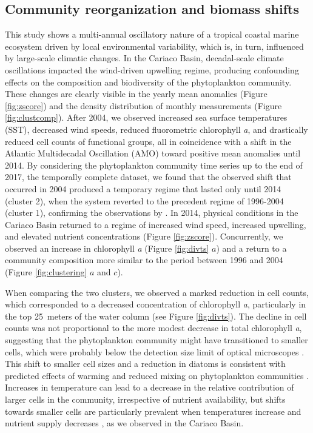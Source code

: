 \documentclass[draft]{agujournal2019}
\begin{document}
\subsection{Community reorganization and biomass shifts}
    This study shows  a multi-annual oscillatory nature of a tropical coastal marine ecosystem driven by local environmental variability, which is, in turn, influenced by large-scale climatic changes. In the Cariaco Basin, decadal-scale climate oscillations impacted the wind-driven upwelling regime, producing confounding effects on the composition and biodiversity of the phytoplankton community.
    These changes are clearly visible in the yearly mean anomalies (Figure \ref{fig:zscore}) and the density distribution of monthly measurements (Figure \ref{fig:clustcomp}). After 2004, we observed increased sea surface temperatures (SST), decreased wind speeds, reduced fluorometric chlorophyll \textit{a}, and drastically reduced cell counts of functional groups, all in coincidence with a shift in the Atlantic Multidecadal Oscillation (AMO) toward positive mean anomalies until 2014. 
    By considering the phytoplankton community time series up to the end of 2017, the temporally complete dataset, we found that the observed shift that occurred in 2004 produced a temporary regime that lasted only until 2014 (cluster 2), when the system reverted to the precedent regime of 1996-2004 (cluster 1), confirming the observations by . In 2014, physical conditions in the Cariaco Basin returned to a regime of increased wind speed, increased upwelling, and elevated nutrient concentrations (Figure \ref{fig:zscore}). Concurrently, we observed an increase in chlorophyll \textit{a} (Figure \ref{fig:divts} $a$) and a return to a community composition more similar to the period between 1996 and 2004 (Figure \ref{fig:clustering} $a$ and $c$).
    
    When comparing the two clusters, we observed a marked reduction in cell counts, which corresponded to a decreased concentration of chlorophyll \textit{a}, particularly in the top \qty{25}{meters} of the water column (see Figure \ref{fig:divts}). The decline in cell counts was not proportional to the more modest decrease in total chlorophyll \textit{a}, suggesting that the phytoplankton community might have transitioned to smaller cells, which were probably below the detection size limit of optical microscopes \cite{muller-karger_scientific_2019}. This shift to smaller cell sizes and a reduction in diatoms is consistent with predicted effects of warming and reduced mixing on phytoplankton communities \cite{bopp_response_2005}. Increases in temperature can lead to a decrease in the relative contribution of larger cells in the community, irrespective of nutrient availability, but shifts towards smaller cells are particularly prevalent when temperatures increase and nutrient supply decreases \cite{mousing_global_2014}, as we observed in the Cariaco Basin. 
    
\end{document}
